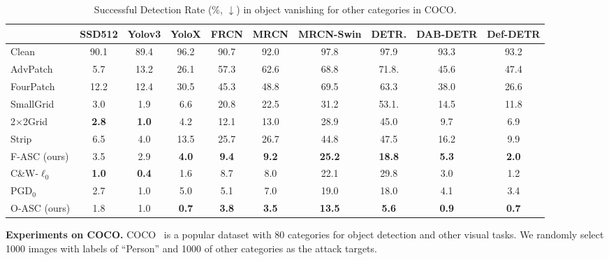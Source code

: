 \documentclass[times,twocolumn,final,authoryear]{elsarticle}
\begin{document}
\begin{table*}[!h]
\centering
\caption{Successful Detection Rate (\%, $\downarrow$) in object vanishing for other categories in COCO. 
}
\begin{tabular}{l|ccccccccc}
\hline
                & SSD512    & Yolov3    & YoloX     & FRCN   & MRCN     & MRCN-Swin     & DETR.     & DAB-DETR      &    Def-DETR       \\ \hline
\hline
Clean           & 90.1      & 89.4      &  96.2     & 90.7   & 92.0     &   97.8        & 97.9      &  93.3         &   93.2            \\
\hline
AdvPatch        & 5.7       & 13.2      &   26.1    & 57.3   & 62.6     &   68.8        & 71.8.     &  45.6         &  47.4                 \\
FourPatch       & 12.2      & 12.4      &  30.5     & 45.3   & 48.8     &   69.5        & 63.3      &  38.0         &  26.6                 \\
SmallGrid       & 3.0       & 1.9       &  6.6      & 20.8   & 22.5     &    31.2       & 53.1.     &   14.5        &   11.8            \\ 
2$\times$2Grid  & \bf{2.8}  &  \bf{1.0} &   4.2     & 12.1   & 13.0     &    28.9       & 45.0      &   9.7         &   6.9             \\
Strip           & 6.5       & 4.0       &  13.5     & 25.7   & 26.7     &  44.8         & 47.5      &  16.2         &   9.9             \\
F-ASC (ours)    & 3.5       & 2.9       &   \bf{4.0}&\bf{9.4}& \bf{9.2} &    \bf{25.2}  & \bf{18.8} &  \bf{5.3}     &    \bf{2.0}            \\ \hline \hline
C\&W-$\ell_0$   & \bf{1.0}  & \bf{0.4}  &  1.6      & 8.7    & 8.0      &  22.1         & 29.8      &   3.0         &       1.2         \\ 
PGD$_{0}$       & 2.7       & 1.0       &    5.0    & 5.1    & 7.0      &    19.0       & 18.0      &  4.1          &     3.4           \\
O-ASC (ours)    & 1.8       & 1.0       &   \bf{0.7}&\bf{3.8}&\bf{3.5}  &  \bf{13.5}    & \bf{ 5.6} &   \bf{0.9}    &    \bf{0.7}               \\ \hline
\end{tabular}
\label{tab:disappear_other}

\end{table*}


\textbf{Experiments on COCO.} 
COCO~\citep{lin2014microsoft} is a popular dataset with 80 categories for object detection and other visual tasks. We randomly select 1000 images with labels of ``Person'' and 1000 of other categories as the attack targets.%
\end{document}
